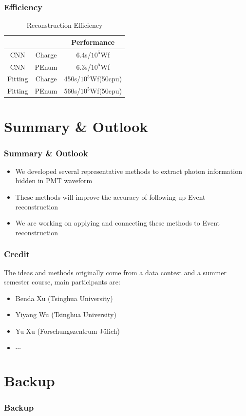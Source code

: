 \documentclass{beamer}
\begin{document}
\begin{frame}
\frametitle{Efficiency}
\begin{table}
    \centering
    \caption{Reconstruction Efficiency}
    \begin{tabular}{c|c|c}
        \hline
        &  & Performance \\
        \hline
        CNN & Charge & 6.4s/$10^{5}$Wf \\
        \hline
        CNN & PEnum & 6.3s/$10^{5}$Wf\\
        \hline
        Fitting & Charge & 450s/$10^{5}$Wf(50cpu) \\
        \hline
        Fitting & PEnum & 560s/$10^{5}$Wf(50cpu) \\
        \hline
    \end{tabular}
\end{table}
\end{frame}

\section{Summary \& Outlook}
\begin{frame}
\frametitle{Summary \& Outlook}
\begin{itemize}
    \item We developed several representative methods to extract photon information hidden in PMT waveform
    \item These methods will improve the accuracy of following-up Event reconstruction
    \item We are working on applying and connecting these methods to Event reconstruction
\end{itemize}
\end{frame}

\begin{frame}
\frametitle{Credit}
\hspace{4mm}The ideas and methods originally come from a data contest and a summer semester course, main participants are:
\begin{itemize}
    \item Benda Xu (Tsinghua University)
    \item Yiyang Wu (Tsinghua University)
    \item Yu Xu (Forschungszentrum Jülich)
    \item $\cdots$
\end{itemize}
\end{frame}

\appendix
\section{Backup}
\begin{frame}
\frametitle{Backup}
    
\end{frame}
\end{document}
